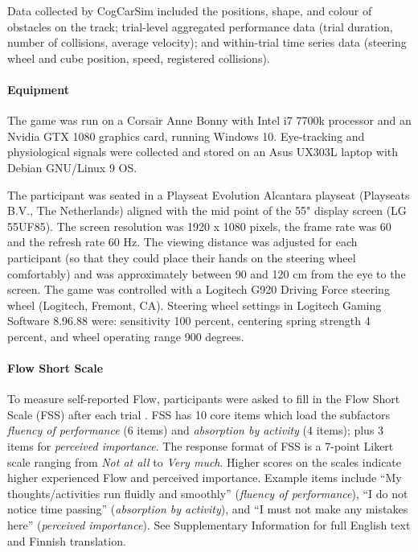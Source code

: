 \documentclass{frontierstyle/frontiersSCNS}
\begin{document}
Data collected by CogCarSim included the positions, shape, and colour of obstacles on the track; trial-level aggregated performance data (trial duration, number of collisions, average velocity); and within-trial time series data (steering wheel and cube position, speed, registered collisions).

\paragraph*{Equipment} The game was run on a Corsair Anne Bonny with Intel i7 7700k processor and an Nvidia GTX 1080 graphics card, running Windows 10. Eye-tracking and physiological signals were collected and stored on an Asus UX303L laptop with Debian GNU/Linux 9 OS.

The participant was seated in a Playseat Evolution Alcantara playseat (Playseats B.V., The Netherlands) aligned with the mid point of the 55" display screen (LG 55UF85). The screen resolution was 1920 x 1080 pixels, the frame rate was 60 and the refresh rate 60 Hz. The viewing distance was adjusted for each participant (so that they could place their hands on the steering wheel comfortably) and was approximately between 90 and 120 cm from the eye to the screen. The game was controlled with a Logitech G920 Driving Force steering wheel (Logitech, Fremont, CA). Steering wheel settings in Logitech Gaming Software 8.96.88 were: sensitivity 100 percent, centering spring strength 4 percent, and wheel operating range 900 degrees.


\paragraph*{Flow Short Scale} To measure self-reported Flow, participants were asked to fill in the Flow Short Scale (FSS) after each trial \citep{Rheinberg2003,Engeser2008}. FSS has 10 core items which load the subfactors {\it fluency of performance} (6 items) and {\it absorption by activity} (4 items); plus 3 items for {\it perceived importance}. The response format of FSS is a 7-point Likert scale ranging from {\it Not at all} to {\it Very much}. Higher scores on the scales indicate higher experienced Flow and perceived importance. Example items include ``My thoughts/activities run fluidly and smoothly'' ({\it fluency of performance}), ``I do not notice time passing'' ({\it absorption by activity}), and ``I must not make any mistakes here'' ({\it perceived importance}). See Supplementary Information for full English text and Finnish translation.
\end{document}
